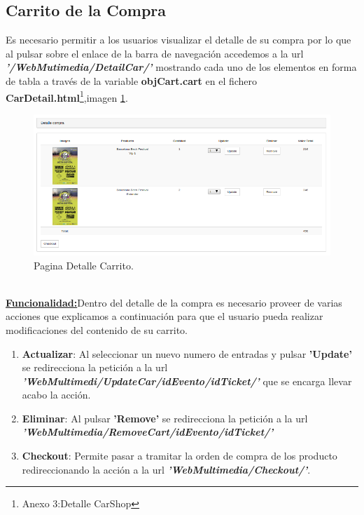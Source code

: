 \subsection{Carrito de la Compra}
Es necesario permitir a los usuarios visualizar el detalle de su compra por lo que al pulsar sobre el enlace de la barra de navegación accedemos a la url \textit{\textbf{'/WebMutimedia/DetailCar/'}} mostrando cada uno de los elementos en forma de tabla a través de la variable \textbf{objCart.cart} en el fichero \textbf{CarDetail.html}\footnote{Anexo 3:Detalle CarShop},imagen \ref{fig:Detalle_CarShop}. 
\begin{figure}[!h]
  \begin{center}
     \includegraphics[width=0.5\linewidth]{Figures/Detalle_CarShop}
      \decoRule
      \caption[Detalle Carrito]{Pagina Detalle Carrito.}
  \label{fig:Detalle_CarShop}
  \end{center}
\end{figure}
\\\underline{\textbf{Funcionalidad:}}Dentro del detalle de la compra es necesario proveer de varias acciones que explicamos a continuación para que el usuario pueda realizar modificaciones del contenido de su carrito.
\begin{enumerate}
\item \textbf{Actualizar}: Al seleccionar un nuevo numero de entradas y pulsar \textbf{'Update'} se redirecciona la petición a la url \textit{\textbf{'WebMultimedi/UpdateCar/idEvento/idTicket/'}} que se encarga llevar acabo la acción.
\item \textbf{Eliminar}: Al pulsar \textbf{'Remove'} se redirecciona la petición a la url \textit{\textbf{'WebMultimedia/RemoveCart/idEvento/idTicket/'}}
\item \textbf{Checkout}: Permite pasar a tramitar la orden de compra de los producto redireccionando la acción a la url \textit{\textbf{'WebMultimedia/Checkout/'}}.
\end{enumerate}
